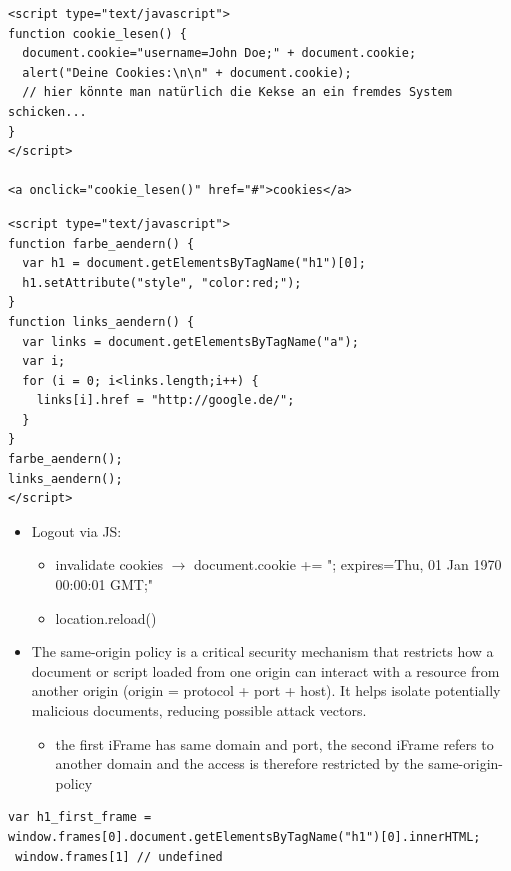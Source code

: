 \documentclass[11pt]{article}
\begin{document}
\begin{lstlisting}
<script type="text/javascript">
function cookie_lesen() {
  document.cookie="username=John Doe;" + document.cookie;
  alert("Deine Cookies:\n\n" + document.cookie);
  // hier könnte man natürlich die Kekse an ein fremdes System schicken...
}
</script>

<a onclick="cookie_lesen()" href="#">cookies</a>
\end{lstlisting}
\lstset{breaklines=true,language=javascript,label= ,caption= ,captionpos=b,numbers=none}
\begin{lstlisting}
<script type="text/javascript">
function farbe_aendern() {
  var h1 = document.getElementsByTagName("h1")[0];
  h1.setAttribute("style", "color:red;");
}
function links_aendern() {
  var links = document.getElementsByTagName("a");
  var i;
  for (i = 0; i<links.length;i++) {
    links[i].href = "http://google.de/";
  }
}
farbe_aendern();
links_aendern();
</script>
\end{lstlisting}
\begin{itemize}
\item Logout via JS:
\begin{itemize}
\item invalidate cookies \(\rightarrow\) document.cookie += "; expires=Thu, 01 Jan 1970 00:00:01 GMT;"
\item location.reload()
\end{itemize}
\item The same-origin policy is a critical security mechanism that restricts how a document or script loaded from one origin can interact with a resource from another origin (origin = protocol + port + host). It helps isolate potentially malicious documents, reducing possible attack vectors.
\begin{itemize}
\item the first iFrame has same domain and port, the second iFrame refers to another domain and the access is therefore restricted by the same-origin-policy
\end{itemize}
\end{itemize}
\lstset{breaklines=true,language=javascript,label= ,caption= ,captionpos=b,numbers=none}
\begin{lstlisting}
var h1_first_frame = window.frames[0].document.getElementsByTagName("h1")[0].innerHTML;
 window.frames[1] // undefined
\end{lstlisting}
\end{document}
